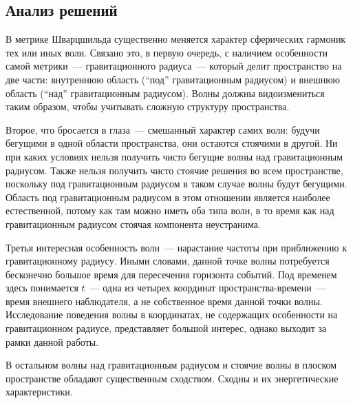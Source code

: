 \documentclass[\docroot/reports/draft/report.tex]{subfiles}
\begin{document}
\subsection{Анализ решений}

    В метрике Шварцшильда существенно меняется характер сферических гармоник тех или иных волн. Связано это, в первую очередь, с наличием особенности самой метрики~--- гравитационного радиуса~--- который делит пространство на две части: внутреннюю область (\enquote{под} гравитационным радиусом) и внешнюю область (\enquote{над} гравитационным радиусом). Волны должны видоизмениться таким образом, чтобы учитывать сложную структуру пространства.

    Второе, что бросается в глаза~--- смешанный характер самих волн: будучи бегущими в одной области пространства, они остаются стоячими в другой. Ни при каких условиях нельзя получить чисто бегущие волны над гравитационным радиусом. Также нельзя получить чисто стоячие решения во всем пространстве, поскольку под гравитационным радиусом в таком случае волны будут бегущими. Область под гравитационным радиусом в этом отношении является наиболее естественной, потому как там можно иметь оба типа волн, в то время как над гравитационным радиусом стоячая компонента неустранима.

    Третья интересная особенность волн~--- нарастание частоты при приближению к гравитационному радиусу. Иными словами, данной точке волны потребуется бесконечно большое время для пересечения горизонта событий. Под временем здесь понимается $t$~--- одна из четырех координат пространства-времени~--- время внешнего наблюдателя, а не собственное время данной точки волны. Исследование поведения волны в координатах, не содержащих особенности на гравитационном радиусе, представляет большой интерес, однако выходит за рамки данной работы.

    В остальном волны над гравитационным радиусом и стоячие волны в плоском пространстве обладают существенным сходством. Сходны и их энергетические характеристики.

\end{document}
